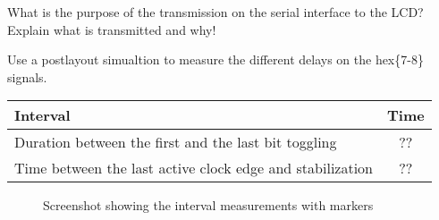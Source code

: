 \documentclass[10pt,a4paper,titlepage,oneside]{article}
\begin{document}
\begin{qa}{What is the purpose of the transmission on the serial interface to the LCD? Explain what is transmitted and why!}

\end{qa}

\begin{qa}{Use a postlayout simualtion to measure the different delays on the \textsf{hex\{7-8\}} signals.}

\begin{center}
\begin{tabular}{lc}
	\hline
	Interval                                                  & Time \\ \hline\hline
	Duration between the first and the last bit toggling      &  ?? \\
	Time between the last active clock edge and stabilization &  ?? \\\hline
\end{tabular}
\end{center}

\begin{figure}[h!]
	\centering
	\dummyimage
	\caption{Screenshot showing the interval measurements with markers}
\end{figure}

\end{qa}



\end{document}
